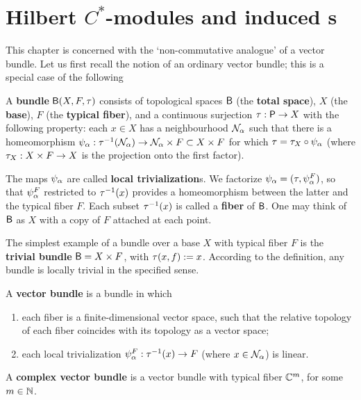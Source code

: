 \section{Hilbert $C^*$-modules and induced \rep s}
 This chapter is concerned with the
 `non-commutative analogue' of a vector bundle. Let us first recall
 the notion of an ordinary vector bundle; this is a special case of
 the following \begin{Definition} A {\bf
 bundle} ${\sf B}(X,F,\tau)$ consists of topological spaces
 ${\sf B}$ (the {\bf total space}), $X$
 (the {\bf base}), $F$ (the {\bf typical
 fiber}), and a continuous surjection
 $\tau:{\sf P}\rightarrow X$ with the following property: each $x\in X$ has a
 neighbourhood ${\cal N}_{\alpha}$ such that there is a homeomorphism
 $\psi_{\alpha}:\tau^{-1}({\cal N}_{\alpha})\rightarrow {\cal N}_{\alpha}\times F\subset X\times F$ for
 which $\tau=\tau_X\circ \psi_{\alpha}$ (where $\tau_X:X\times F\rightarrow X$ is the
 projection onto the first factor).
\end{Definition}

The maps $\psi_{\alpha}$ are called {\bf local trivialization}s. We
factorize $\psi_{\alpha}=(\tau,\psi_{\alpha}^F)$, so that $\psi_{\alpha}^F$
restricted to $\tau^{-1}(x)$ provides a homeomorphism between the latter
and the typical fiber $F$. Each subset $\tau^{-1}(x)$ is called a {\bf
fiber} of ${\sf B}$. One may think of ${\sf B}$ as $X$ with a
copy of $F$ attached at each point.

The simplest example of a bundle over a base $X$ with typical fiber
$F$ is the {\bf trivial bundle} ${\sf B}=X\times F$, with $\tau(x,f):=x$.
According to the definition, any bundle is locally trivial in the
specified sense.
\begin{Definition}
A {\bf vector bundle} is a bundle in which
\begin{enumerate}
\item
each fiber is a finite-dimensional vector space, such that the
 relative topology of each fiber coincides with its topology as a
 vector space;
\item
each local trivialization $\psi_{\alpha}^F:\tau^{-1}(x)\rightarrow F$ (where
 $x\in{\cal N}_{\alpha}$) is linear.
\end{enumerate}
A {\bf complex vector bundle} is a vector bundle with typical fiber
${\Bbb C}^m$, for some $m\in{\Bbb N}$.
\end{Definition}

